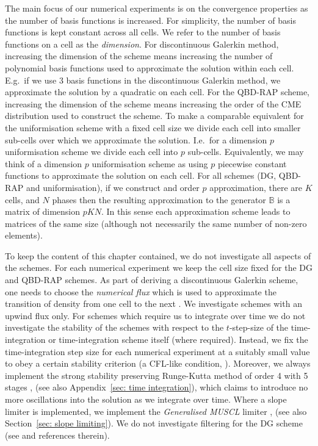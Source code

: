 The main focus of our numerical experiments is on the convergence properties as the number of basis functions is increased. For simplicity, the number of basis functions is kept constant across all cells. We refer to the number of basis functions on a cell as the \emph{dimension}. For discontinuous Galerkin method, increasing the dimension of the scheme means increasing the number of polynomial basis functions used to approximate the solution within each cell. E.g.~if we use 3 basis functions in the discontinuous Galerkin method, we approximate the solution by a quadratic on each cell. For the QBD-RAP scheme, increasing the dimension of the scheme means increasing the order of the CME distribution used to construct the scheme. To make a comparable equivalent for the uniformisation scheme with a fixed cell size we divide each cell into smaller sub-cells over which we approximate the solution. I.e.~for a dimension \(p\) uniformisation scheme we divide each cell into \(p\) sub-cells. Equivalently, we may think of a dimension \(p\) uniformisation scheme as using \(p\) piecewise constant functions to approximate the solution on each cell. For all schemes (DG, QBD-RAP and uniformisation), if we construct and order \(p\) approximation, there are \(K\) cells, and \(N\) phases then the resulting approximation to the generator \(\mathbb B\) is a matrix of dimension \(pKN\). In this sense each approximation scheme leads to matrices of the same size (although not necessarily the same number of non-zero elements). 

To keep the content of this chapter contained, we do not investigate all aspects of the schemes. For each numerical experiment we keep the cell size fixed for the DG and QBD-RAP schemes. As part of deriving a discontinuous Galerkin scheme, one needs to choose the \emph{numerical flux} which is used to approximate the transition of density from one cell to the next \citep{nodalDGBook}. We investigate schemes with an upwind flux only. For schemes which require us to integrate over time we do not investigate the stability of the schemes with respect to the \(t\)-step-size of the time-integration or time-integration scheme itself (where required). Instead, we fix the time-integration step size for each numerical experiment at a suitably small value to obey a certain stability criterion (a CFL-like condition, \citep[Section~4.8]{nodalDGBook}). Moreover, we always implement the strong stability preserving Runge-Kutta method of order 4 with 5 stages \citep{sr2002}, \citep[Section~5.7]{nodalDGBook} (see also Appendix~\ref{sec: time integration}), which claims to introduce no more oscillations into the solution as we integrate over time. Where a slope limiter is implemented, we implement the \emph{Generalised MUSCL} limiter \citep{c99}, \citep[Section~5.6.2]{nodalDGBook} (see also Section~\ref{sec: slope limiting}). We do not investigate filtering for the DG scheme (see \citep[Section~5.6.1]{nodalDGBook} and references therein).


